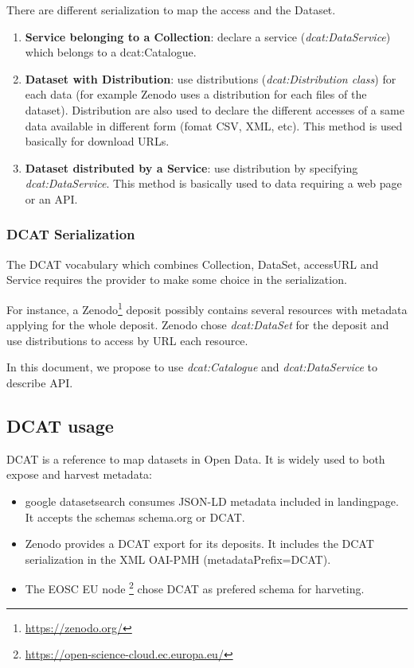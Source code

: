 \documentclass[11pt,a4paper]{ivoa}
\begin{document}
There are different serialization to map the access and the Dataset.\\

\begin{enumerate}
	\item \label{Collection-service} \textbf{Service belonging to a Collection}:
     declare a service (\textit{dcat:DataService}) which belongs to a dcat:Catalogue.
	\item \label{dataset-distribution} \textbf{Dataset with Distribution}:
	use distributions (\textit{dcat:Distribution class}) for each data (for example Zenodo uses a distribution for each files of the dataset). Distribution are also used  to declare the different accesses of a same data available in different form (fomat CSV, XML, etc). 
	This method is used basically for download URLs.
	\item  \label{dataset-combine} \textbf{Dataset distributed by a Service}: use distribution by specifying \textit{dcat:DataService}. This method is basically used to data requiring a web page or an API.   
\end{enumerate}
 
\subsubsection{DCAT Serialization}

The DCAT vocabulary which combines Collection, DataSet, accessURL and Service requires the provider to make some choice in the serialization.

For instance, a Zenodo\footnote{\url{https://zenodo.org/}} deposit possibly contains several resources with  metadata applying for the whole deposit. Zenodo chose \textit{dcat:DataSet} for the deposit and use distributions to access by URL each resource.

In this document, we propose to use \textit{dcat:Catalogue} and \textit{dcat:DataService} to describe API.


\subsection{DCAT usage}
DCAT is a reference to map datasets in Open Data. It is widely used to both expose and harvest metadata:

 \begin{itemize}
\item google datasetsearch consumes JSON-LD metadata included in landingpage. It accepts the schemas schema.org or DCAT.
\item Zenodo provides a DCAT export for its deposits. It includes the DCAT serialization in the XML OAI-PMH (metadataPrefix=DCAT).
\item The EOSC EU node \footnote{\url{https://open-science-cloud.ec.europa.eu/}} chose DCAT as prefered schema for harveting. 
\end{itemize}
\end{document}
